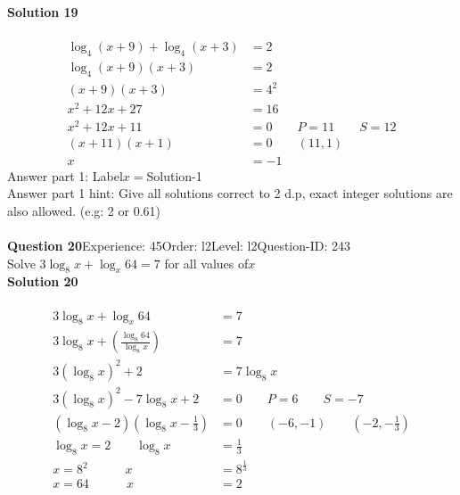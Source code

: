 \documentclass{article}
\begin{document}
\noindent\textbf{Solution 19}\\[2pt]
\\[-35pt]\begin{align*}
\log_{4}(x+9)+\log_{4}(x+3)&=2\\[2pt]
\log_{4}(x+9)(x+3)&=2\\[2pt]
(x+9)(x+3)&=4^2\\[2pt]
x^2+12x+27&=16\\[2pt]
x^2+12x+11&=0\qquad P=11 \qquad S=12\\[2pt]
(x+11)(x+1)&=0\qquad (11,1)\\[2pt]
x&=-1
\end{align*}
Answer part 1: \hspace{10pt}Label\hspace{10pt}$x=$\hspace{10pt}Solution\hspace{10pt}-1\\
Answer part 1 hint: \hspace{15pt}Give all solutions correct to 2 d.p, exact integer solutions are also allowed. (e.g: 2 or 0.61)\\
\\[4pt]
\noindent\textbf{Question 20}\hspace{20pt}Experience: 45\hspace{20pt}Order: l2\hspace{20pt}Level: l2\hspace{20pt}Question-ID: 243\\[2pt]
Solve $3\log_{8}x+\log_{x}64=7$ for all values of$x$\\[4pt]
\noindent\textbf{Solution 20}\\[2pt]
\\[-35pt]\begin{align*}
3\log_{8}x+\log_{x}64&=7\\[2pt]
3\log_{8}x+\left(\displaystyle\frac{\log_{8}64}{\log_{8}x}\right)&=7\\[2pt]
3(\log_{8}x)^2+2&=7\log_{8}x\\[2pt]
3(\log_{8}x)^2-7\log_{8}x+2&=0\qquad P=6 \qquad S=-7\\[2pt]
(\log_{8}x-2)\left(\log_{8}x-\displaystyle\frac{1}{3}\right)&=0\qquad (-6,-1)\qquad \left(-2,-\displaystyle\frac{1}{3}\right)\\[2pt]
\log_{8}x=2 \qquad \log_{8}x&=\displaystyle\frac{1}{3}\\[2pt]
x=8^2 \hspace{36pt} x&=8^{\frac{1}{3}}\\[2pt]
x=64 \hspace{36pt} x&=2
\end{align*}
\end{document}
